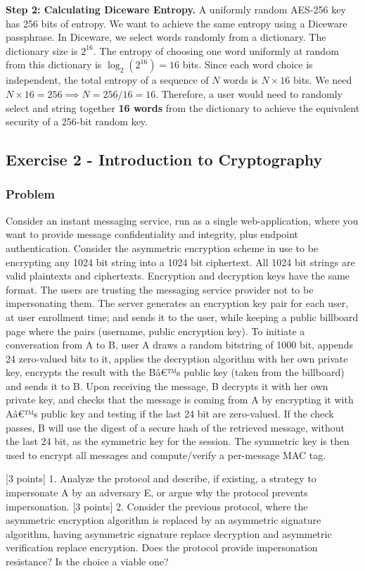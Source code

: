 \documentclass{article}
\begin{document}
\textbf{Step 2: Calculating Diceware Entropy.}
A uniformly random AES-256 key has 256 bits of entropy.
We want to achieve the same entropy using a Diceware passphrase. In Diceware, we select words randomly from a dictionary.
The dictionary size is $2^{16}$.
The entropy of choosing one word uniformly at random from this dictionary is $\log_2(2^{16}) = 16$ bits.
Since each word choice is independent, the total entropy of a sequence of $N$ words is $N \times 16$ bits.
We need $N \times 16 = 256 \implies N = 256 / 16 = 16$.
Therefore, a user would need to randomly select and string together \textbf{16 words} from the dictionary to achieve the equivalent security of a 256-bit random key.

\subsection{Exercise 2 - Introduction to Cryptography}
\subsubsection*{Problem}
Consider an instant messaging service, run as a single web-application, where you want to provide message confidentiality and integrity, plus endpoint authentication. Consider the asymmetric encryption scheme in use to be encrypting any 1024 bit string into a 1024 bit ciphertext. All 1024 bit strings are valid plaintexts and ciphertexts. Encryption and decryption keys have the same format.
The users are trusting the messaging service provider not to be impersonating them. The server generates an encryption key pair for each user, at user enrollment time; and sends it to the user, while keeping a public billboard page where the pairs (username, public encryption key).
To initiate a conversation from A to B, user A draws a random bitstring of 1000 bit, appends 24 zero-valued bits to it, applies the decryption algorithm with her own private key, encrypts the result with the Bâ€™s public key (taken from the billboard) and sends it to B.
Upon receiving the message, B decrypts it with her own private key, and checks that the message is coming from A by encrypting it with Aâ€™s public key and testing if the last 24 bit are zero-valued. If the check passes, B will use the digest of a secure hash of the retrieved message, without the last 24 bit, as the symmetric key for the session. The symmetric key is then used to encrypt all messages and compute/verify a per-message MAC tag.

[3 points] 1. Analyze the protocol and describe, if existing, a strategy to impersonate A by an adversary E, or argue why the protocol prevents impersonation.
[3 points] 2. Consider the previous protocol, where the asymmetric encryption algorithm is replaced by an asymmetric signature algorithm, having asymmetric signature replace decryption and asymmetric verification replace encryption. Does the protocol provide impersonation resistance? Is the choice a viable one?
\end{document}
